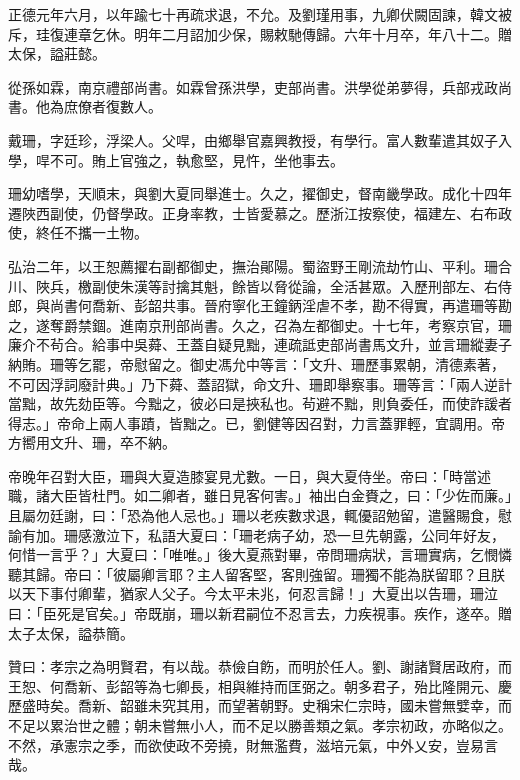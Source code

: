 \begin{pinyinscope}
正德元年六月，以年踰七十再疏求退，不允。及劉瑾用事，九卿伏闕固諫，韓文被斥，珪復連章乞休。明年二月詔加少保，賜敕馳傳歸。六年十月卒，年八十二。贈太保，謚莊懿。

從孫如霖，南京禮部尚書。如霖曾孫洪學，吏部尚書。洪學從弟夢得，兵部戎政尚書。他為庶僚者復數人。

戴珊，字廷珍，浮梁人。父哻，由鄉舉官嘉興教授，有學行。富人數輩遣其奴子入學，哻不可。賄上官強之，執愈堅，見忤，坐他事去。

珊幼嗜學，天順末，與劉大夏同舉進士。久之，擢御史，督南畿學政。成化十四年遷陜西副使，仍督學政。正身率教，士皆愛慕之。歷浙江按察使，福建左、右布政使，終任不攜一土物。

弘治二年，以王恕薦擢右副都御史，撫治鄖陽。蜀盜野王剛流劫竹山、平利。珊合川、陜兵，檄副使朱漢等討擒其魁，餘皆以脅從論，全活甚眾。入歷刑部左、右侍郎，與尚書何喬新、彭韶共事。晉府寧化王鐘鈵淫虐不孝，勘不得實，再遣珊等勘之，遂奪爵禁錮。進南京刑部尚書。久之，召為左都御史。十七年，考察京官，珊廉介不茍合。給事中吳蕣、王蓋自疑見黜，連疏詆吏部尚書馬文升，並言珊縱妻子納賄。珊等乞罷，帝慰留之。御史馮允中等言：「文升、珊歷事累朝，清德素著，不可因浮詞廢計典。」乃下蕣、蓋詔獄，命文升、珊即舉察事。珊等言：「兩人逆計當黜，故先劾臣等。今黜之，彼必曰是挾私也。茍避不黜，則負委任，而使詐諼者得志。」帝命上兩人事蹟，皆黜之。已，劉健等因召對，力言蓋罪輕，宜調用。帝方嚮用文升、珊，卒不納。

帝晚年召對大臣，珊與大夏造膝宴見尤數。一日，與大夏侍坐。帝曰：「時當述職，諸大臣皆杜門。如二卿者，雖日見客何害。」袖出白金賚之，曰：「少佐而廉。」且屬勿廷謝，曰：「恐為他人忌也。」珊以老疾數求退，輒優詔勉留，遣醫賜食，慰諭有加。珊感激泣下，私語大夏曰：「珊老病子幼，恐一旦先朝露，公同年好友，何惜一言乎？」大夏曰：「唯唯。」後大夏燕對畢，帝問珊病狀，言珊實病，乞憫憐聽其歸。帝曰：「彼屬卿言耶？主人留客堅，客則強留。珊獨不能為朕留耶？且朕以天下事付卿輩，猶家人父子。今太平未兆，何忍言歸！」大夏出以告珊，珊泣曰：「臣死是官矣。」帝既崩，珊以新君嗣位不忍言去，力疾視事。疾作，遂卒。贈太子太保，謚恭簡。

贊曰：孝宗之為明賢君，有以哉。恭儉自飭，而明於任人。劉、謝諸賢居政府，而王恕、何喬新、彭韶等為七卿長，相與維持而匡弼之。朝多君子，殆比隆開元、慶歷盛時矣。喬新、韶雖未究其用，而望著朝野。史稱宋仁宗時，國未嘗無嬖幸，而不足以累治世之體；朝未嘗無小人，而不足以勝善類之氣。孝宗初政，亦略似之。不然，承憲宗之季，而欲使政不旁撓，財無濫費，滋培元氣，中外乂安，豈易言哉。


\end{pinyinscope}